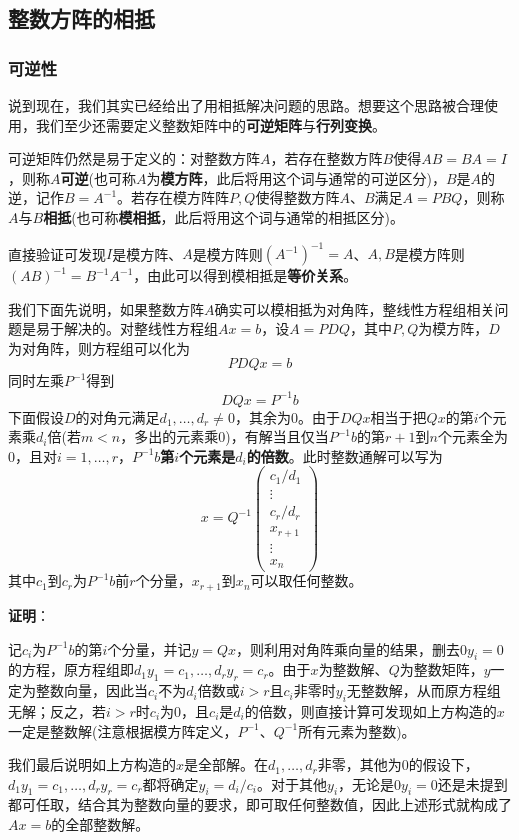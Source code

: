 \documentclass[a4paper,UTF8,fontset=windows,AutoFakeBold]{ctexart}
\newcommand*{\note}{\noindent *}
\newcommand{\proo}[1]{{\vspace{5pt}\kaishu\noindent\textbf{证明}：\vspace{-3pt}
\begin{compactitem}
    \item[] #1
\end{compactitem}
}}
\begin{document}
\subsection{整数方阵的相抵}
\subsubsection{可逆性}
说到现在，我们其实已经给出了用相抵解决问题的思路。想要这个思路被合理使用，我们至少还需要定义整数矩阵中的\textbf{可逆矩阵}与\textbf{行列变换}。

可逆矩阵仍然是易于定义的：对整数方阵$A$，若存在整数方阵$B$使得$AB=BA=I$，则称$A$\textbf{可逆}(也可称$A$为\textbf{模方阵}，此后将用这个词与通常的可逆区分)，$B$是$A$的逆，记作$B=A^{-1}$。若存在模方阵阵$P,Q$使得整数方阵$A$、$B$满足$A=PBQ$，则称$A$与$B$\textbf{相抵}(也可称\textbf{模相抵}，此后将用这个词与通常的相抵区分)。

\note 直接验证可发现$I$是模方阵、$A$是模方阵则$(A^{-1})^{-1}=A$、$A,B$是模方阵则$(AB)^{-1}=B^{-1}A^{-1}$，由此可以得到模相抵是\textbf{等价关系}。

我们下面先说明，如果整数方阵$A$确实可以模相抵为对角阵，整线性方程组相关问题是易于解决的。对整线性方程组$Ax=b$，设$A=PDQ$，其中$P,Q$为模方阵，$D$为对角阵，则方程组可以化为
$$PDQx=b$$
同时左乘$P^{-1}$得到
$$DQx=P^{-1}b$$
下面假设$D$的对角元满足$d_1,\dots,d_r\ne0$，其余为0。由于$DQx$相当于把$Qx$的第$i$个元素乘$d_i$倍(若$m<n$，多出的元素乘0)，有解当且仅当$P^{-1}b$的第$r+1$到$n$个元素全为0，且对$i=1,\dots,r$，\textbf{$P^{-1}b$第$i$个元素是$d_i$的倍数}。此时整数通解可以写为
$$x=Q^{-1}\begin{pmatrix}c_1/d_1\\\vdots\\c_r/d_r\\x_{r+1}\\\vdots\\x_n\end{pmatrix}$$
其中$c_1$到$c_r$为$P^{-1}b$前$r$个分量，$x_{r+1}$到$x_n$可以取任何整数。

\proo{
    记$c_i$为$P^{-1}b$的第$i$个分量，并记$y=Qx$，则利用对角阵乘向量的结果，删去$0y_i=0$的方程，原方程组即$d_1y_1=c_1,\dots,d_ry_r=c_r$。由于$x$为整数解、$Q$为整数矩阵，$y$一定为整数向量，因此当$c_i$不为$d_i$倍数或$i>r$且$c_i$非零时$y_i$无整数解，从而原方程组无解；反之，若$i>r$时$c_i$为0，且$c_i$是$d_i$的倍数，则直接计算可发现如上方构造的$x$一定是整数解(注意根据模方阵定义，$P^{-1}$、$Q^{-1}$所有元素为整数)。

    我们最后说明如上方构造的$x$是全部解。在$d_1,\dots,d_r$非零，其他为0的假设下，$d_1y_1=c_1,\dots,d_ry_r=c_r$都将确定$y_i=d_i/c_i$。对于其他$y_i$，无论是$0y_i=0$还是未提到都可任取，结合其为整数向量的要求，即可取任何整数值，因此上述形式就构成了$Ax=b$的全部整数解。
}
\end{document}
